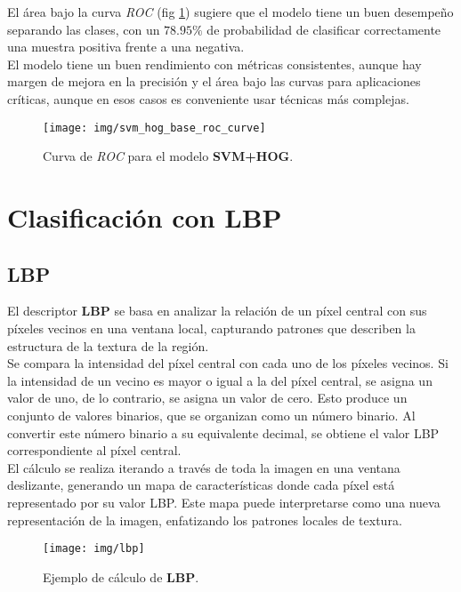 \documentclass[12pt,letterpaper]{article}
\begin{document}
El área bajo la curva \textit{ROC} (fig \ref{fig:roc_hog}) sugiere que el modelo tiene un buen desempeño separando las clases, con un $78.95\%$ de probabilidad de clasificar correctamente una muestra positiva frente a una negativa.\\[6pt]
El modelo tiene un buen rendimiento con métricas consistentes, aunque hay margen de mejora en la precisión y el área bajo las curvas para aplicaciones críticas, aunque en esos casos es conveniente usar técnicas más complejas.

\begin{figure}[htp]
    \centering
    \texttt{[image: img/svm\_hog\_base\_roc\_curve]}
    \caption{Curva de \textit{ROC} para el modelo \textbf{SVM+HOG}.}
    \label{fig:roc_hog}
\end{figure}

\section{Clasificación con LBP}
\subsection{LBP}
El descriptor \textbf{LBP} se basa en analizar la relación de un píxel central con sus píxeles vecinos en una ventana local, capturando patrones que describen la estructura de la textura de la región.\\[6pt]
Se compara la intensidad del píxel central con cada uno de los píxeles vecinos. Si la intensidad de un vecino es mayor o igual a la del píxel central, se asigna un valor de uno, de lo contrario, se asigna un valor de cero. Esto produce un conjunto de valores binarios, que se organizan como un número binario. Al convertir este número binario a su equivalente decimal, se obtiene el valor LBP correspondiente al píxel central.\\[6pt]
El cálculo se realiza iterando a través de toda la imagen en una ventana deslizante, generando un mapa de características donde cada píxel está representado por su valor LBP. Este mapa puede interpretarse como una nueva representación de la imagen, enfatizando los patrones locales de textura.

\begin{figure}[htp]
    \centering
    \texttt{[image: img/lbp]}
    \caption{Ejemplo de cálculo de \textbf{LBP}.}
    \label{fig:lbp}
\end{figure}
\end{document}
